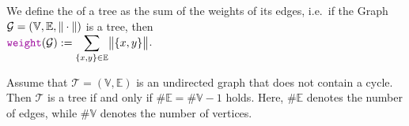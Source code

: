 \begin{Definition}
We define the  of a tree  as the sum of the weights of its edges,
i.e.~if the Graph $\mathcal{G} = (\mathbb{V},\mathbb{E}, \|\cdot\|)$ is a tree, then
\\[0.2cm]
\hspace*{1.3cm}
$\ds \mytt{weight}(\mathcal{G}) := \sum\limits_{\{x,y\} \in \mathbb{E}} \Weight{\{x,y\}}$.  \eoxs
\end{Definition}

\begin{Proposition}
  Assume that $\mathcal{T} = (\mathbb{V},\mathbb{E})$ is an undirected graph that does not contain a
  cycle.  Then $\mathcal{T}$ is a tree if and only if $\#\mathbb{E} = \#\mathbb{V} - 1$ holds.  Here, $\#\mathbb{E}$ denotes the number of edges,
  while $\#\mathbb{V}$ denotes the number of vertices.  
\end{Proposition}

